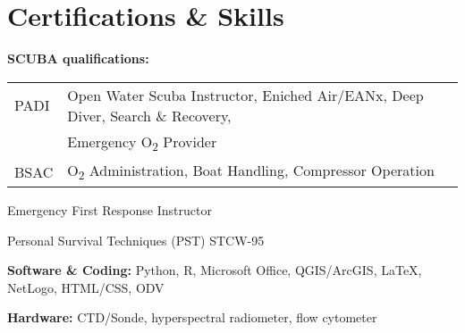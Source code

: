 \documentclass[a4paper]{deedy-resume} %
\begin{document}

\section{Certifications \& Skills}
\sectionspace

\begin{tightitemize}
\item \textbf{SCUBA qualifications:}  \\
\begin{tabular}{ l l }
PADI & Open Water Scuba Instructor, Eniched Air/EANx, Deep Diver, Search \& Recovery,  \\
 & Emergency O\textsubscript{2} Provider \\
BSAC & O\textsubscript{2} Administration, Boat Handling, Compressor Operation
\end{tabular}
\item Emergency First Response Instructor
\item Personal Survival Techniques (PST) STCW-95
\item \textbf{Software \& Coding:} Python, R, Microsoft Office, QGIS/ArcGIS,  \LaTeX, NetLogo, HTML/CSS, ODV
\item \textbf{Hardware:} CTD/Sonde, hyperspectral radiometer, flow cytometer
\end{tightitemize}

\sectionspace %


\end{document}
